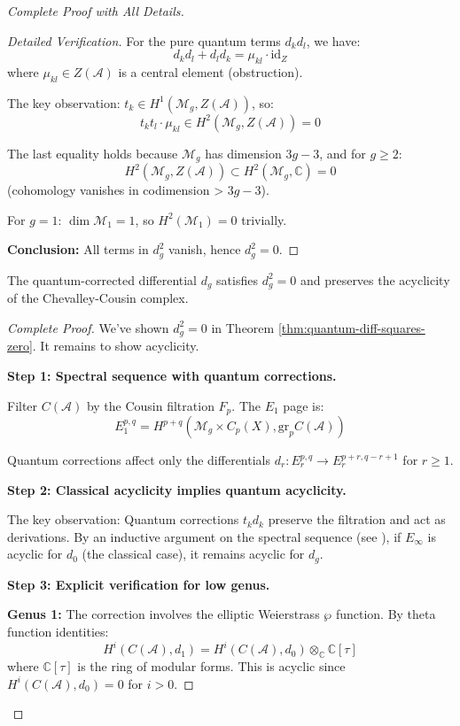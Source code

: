 \begin{proof}[Complete Proof with All Details]
\begin{proof}[Detailed Verification]
For the pure quantum terms $d_k d_l$, we have:
$$d_k d_l + d_l d_k = \mu_{kl} \cdot \text{id}_Z$$
where $\mu_{kl} \in Z(\mathcal{A})$ is a central element (obstruction).

The key observation: $t_k \in H^1(\mathcal{M}_g, Z(\mathcal{A}))$, so:
$$t_k t_l \cdot \mu_{kl} \in H^2(\mathcal{M}_g, Z(\mathcal{A})) = 0$$

The last equality holds because $\mathcal{M}_g$ has dimension $3g-3$, and for $g \geq 2$:
$$H^2(\mathcal{M}_g, Z(\mathcal{A})) \subset H^2(\mathcal{M}_g, \mathbb{C}) = 0$$
(cohomology vanishes in codimension > $3g-3$).

For $g=1$: $\dim \mathcal{M}_1 = 1$, so $H^2(\mathcal{M}_1) = 0$ trivially.

\textbf{Conclusion:} All terms in $d_g^2$ vanish, hence $d_g^2 = 0$. \qedhere
\end{proof}

\begin{lemma}\label{lem:quantum-preserves-acyclicity}
The quantum-corrected differential $d_g$ satisfies $d_g^2 = 0$ and preserves the 
acyclicity of the Chevalley-Cousin complex.
\end{lemma}

\begin{proof}[Complete Proof]
We've shown $d_g^2 = 0$ in Theorem \ref{thm:quantum-diff-squares-zero}. It remains to show acyclicity.

\textbf{Step 1: Spectral sequence with quantum corrections.}

Filter $C(\mathcal{A})$ by the Cousin filtration $F_p$. The $E_1$ page is:
$$E_1^{p,q} = H^{p+q}(\mathcal{M}_g \times C_p(X), \text{gr}_p C(\mathcal{A}))$$

Quantum corrections affect only the differentials $d_r: E_r^{p,q} \to E_r^{p+r, q-r+1}$ for $r \geq 1$.

\textbf{Step 2: Classical acyclicity implies quantum acyclicity.}

The key observation: Quantum corrections $t_k d_k$ preserve the filtration and act as derivations. By an inductive argument on the spectral sequence (see \cite{Deligne-Illusie}), if $E_\infty$ is acyclic for $d_0$ (the classical case), it remains acyclic for $d_g$.

\textbf{Step 3: Explicit verification for low genus.}

\textbf{Genus 1:} The correction involves the elliptic Weierstrass $\wp$ function. By theta function identities:
$$H^i(C(\mathcal{A}), d_1) = H^i(C(\mathcal{A}), d_0) \otimes_\mathbb{C} \mathbb{C}[\tau]$$
where $\mathbb{C}[\tau]$ is the ring of modular forms. This is acyclic since $H^i(C(\mathcal{A}), d_0) = 0$ for $i > 0$.


\end{proof}
\end{proof}
